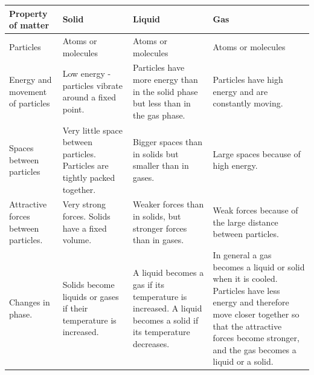 \begin{table}[h]
\begin{center}

\begin{tabular}{|p{3cm}|p{3cm}|p{3cm}|p{3cm}|}\hline
\textbf{Property of matter} & \textbf{Solid} & \textbf{Liquid} & \textbf{Gas} \\\hline
Particles & Atoms or molecules & Atoms or molecules & Atoms or molecules \\\hline
Energy and movement of particles & Low energy - particles vibrate around a fixed point. & Particles have more energy than in the solid phase but less than in the gas phase. & Particles have high energy and are constantly moving.  \\\hline
Spaces between particles & Very little space between particles. Particles are tightly packed together. & Bigger spaces than in solids but smaller than in gases. & Large spaces because of high energy.  \\\hline
Attractive forces between particles. & Very strong forces. Solids have a fixed volume. & Weaker forces than in solids, but stronger forces than in gases. & Weak forces because of the large distance between particles.  \\\hline
Changes in phase. & Solids become liquids or gases if their temperature is increased. & A liquid becomes a gas if its temperature is increased. A liquid becomes a solid if its temperature decreases. & In general a gas becomes a liquid or solid when it is cooled. Particles have less energy and therefore move closer together so that the attractive forces become stronger, and the gas becomes a liquid or a solid.  \\\hline
\end{tabular}
\label{tab:microscopic:kinetic theory}
\end{center}
\end{table}
    \par

